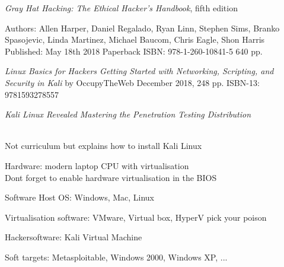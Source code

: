 \documentclass[Screen16to9,17pt]{foils}
\begin{document}


\emph{Gray Hat Hacking: The Ethical Hacker's Handbook}, fifth edition

Authors: Allen Harper, Daniel Regalado, Ryan Linn, Stephen Sims, Branko Spasojevic, Linda Martinez, Michael Baucom, Chris Eagle, Shon Harris\\
Published: May 18th 2018
Paperback ISBN: 978-1-260-10841-5 640 pp.

{\footnotesize{}}



\emph{Linux Basics for Hackers
Getting Started with Networking, Scripting, and Security in Kali}
by OccupyTheWeb
December 2018, 248 pp.
ISBN-13:
9781593278557





\emph{Kali Linux Revealed  Mastering the Penetration Testing Distribution}

\\
Not curriculum but explains how to install Kali Linux






\begin{list2}
\item Hardware: modern laptop CPU with virtualisation\\
Dont forget to enable hardware virtualisation in the BIOS
\item Software Host OS: Windows, Mac, Linux
\item Virtualisation software: VMware, Virtual box, HyperV pick your poison
\item Hackersoftware: Kali Virtual Machine 
\item Soft targets: Metasploitable, Windows 2000, Windows XP, ...
\end{list2}
\end{document}
